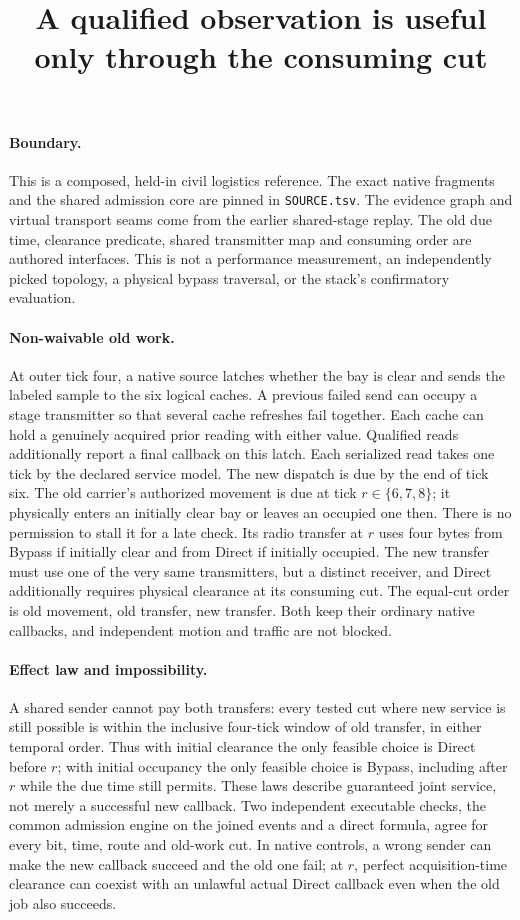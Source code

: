 \documentclass{article}
\title{A qualified observation is useful only through the consuming cut}
\date{}
\begin{document}
\maketitle

\paragraph{Boundary.}
This is a composed, held-in civil logistics reference. The exact
native fragments and the shared admission core are pinned in
\verb|SOURCE.tsv|. The evidence graph and virtual transport seams
come from the earlier shared-stage replay. The old due time, clearance
predicate, shared transmitter map and consuming order are authored
interfaces. This is not a performance measurement, an independently
picked topology, a physical bypass traversal, or the stack's
confirmatory evaluation.

\paragraph{Non-waivable old work.}
At outer tick four, a native source latches whether the bay is clear
and sends the labeled sample to the six logical caches. A previous
failed send can occupy a stage transmitter so that several cache
refreshes fail together. Each cache can hold a genuinely acquired
prior reading with either value. Qualified reads additionally report
a final callback on this latch. Each serialized read takes one tick
by the declared service model. The new dispatch is due by the end
of tick six. The old carrier's authorized movement is due at tick
$r\in\{6,7,8\}$; it physically enters an initially clear bay or
leaves an occupied one then. There is no permission to stall it for
a late check. Its radio transfer at $r$ uses four bytes from Bypass
if initially clear and from Direct if initially occupied. The new
transfer must use one of the very same transmitters, but a distinct
receiver, and Direct additionally requires physical clearance at
its consuming cut. The equal-cut order is old movement, old
transfer, new transfer. Both keep their ordinary native callbacks,
and independent motion and traffic are not blocked.

\paragraph{Effect law and impossibility.}
A shared sender cannot pay both transfers: every tested cut where
new service is still possible is within the inclusive four-tick
window of old transfer, in either temporal order. Thus with initial
clearance the only feasible choice is Direct before $r$; with
initial occupancy the only feasible choice is Bypass, including
after $r$ while the due time still permits. These laws describe
guaranteed joint service, not merely a successful new callback.
Two independent executable checks, the common admission engine on
the joined events and a direct formula, agree for every bit, time,
route and old-work cut. In native controls, a wrong sender can make
the new callback succeed and the old one fail; at $r$, perfect
acquisition-time clearance can coexist with an unlawful actual
Direct callback even when the old job also succeeds.
\end{document}
